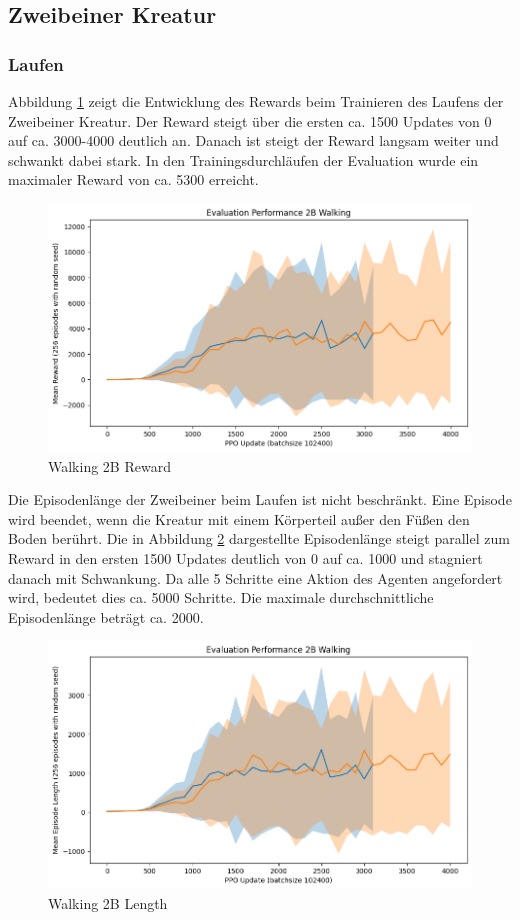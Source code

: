 \subsection{Zweibeiner Kreatur}

\subsubsection{Laufen}
Abbildung \ref{fig:Walking2B_Reward} zeigt die Entwicklung des Rewards beim Trainieren des Laufens der Zweibeiner Kreatur. Der Reward steigt über die ersten ca. 1500 Updates von 0 auf ca. 3000-4000 deutlich an. Danach ist steigt der Reward langsam weiter und schwankt dabei stark. In den Trainingsdurchläufen der Evaluation wurde ein maximaler Reward von ca. 5300 erreicht.

\begin{figure}[ht]
    \centering
    \includegraphics[width=0.5\linewidth]{resources/img/results/Walking2B_Reward.png}
    \caption{Walking 2B Reward}\label{fig:Walking2B_Reward}
\end{figure}

Die Episodenlänge der Zweibeiner beim Laufen ist nicht beschränkt. Eine Episode wird beendet, wenn die Kreatur mit einem Körperteil außer den Füßen den Boden berührt. Die in Abbildung \ref{fig:Walking2B_Length} dargestellte Episodenlänge steigt parallel zum Reward in den ersten 1500 Updates deutlich von 0 auf ca. 1000 und stagniert danach mit Schwankung. Da alle 5 Schritte eine Aktion des Agenten angefordert wird, bedeutet dies ca. 5000 Schritte. Die maximale durchschnittliche Episodenlänge beträgt ca. 2000.

\begin{figure}[ht]
    \centering
    \includegraphics[width=0.5\linewidth]{resources/img/results/Walking2B_Length.png}
    \caption{Walking 2B Length}\label{fig:Walking2B_Length}
\end{figure}

